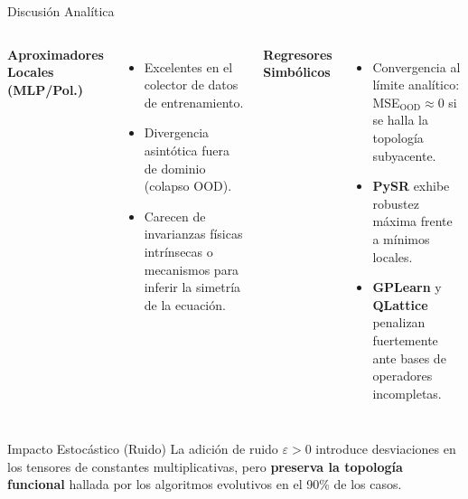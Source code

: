 \documentclass[10pt, aspectratio=169]{beamer}
\begin{document}
\begin{frame}{Discusión Analítica}
    \begin{columns}[T]
        \textbf{Aproximadores Locales (MLP/Pol.)}
        \begin{itemize}
            \item Excelentes en el colector de datos de entrenamiento.
            \item Divergencia asintótica fuera de dominio (colapso OOD). 
            \item Carecen de invarianzas físicas intrínsecas o mecanismos para inferir la simetría de la ecuación.
        \end{itemize}

        \textbf{Regresores Simbólicos}
        \begin{itemize}
            \item Convergencia al límite analítico: MSE$_\text{OOD} \approx 0$ si se halla la topología subyacente.
            \item \textbf{PySR} exhibe robustez máxima frente a mínimos locales.
            \item \textbf{GPLearn} y \textbf{QLattice} penalizan fuertemente ante bases de operadores incompletas.
        \end{itemize}
    \end{columns}
    
    \vspace{0.6cm}
    \begin{block}{Impacto Estocástico (Ruido)}
        La adición de ruido $\varepsilon > 0$ introduce desviaciones en los tensores de constantes multiplicativas, pero \textbf{preserva la topología funcional} hallada por los algoritmos evolutivos en el 90\% de los casos.
    \end{block}
\end{frame}
\end{document}
